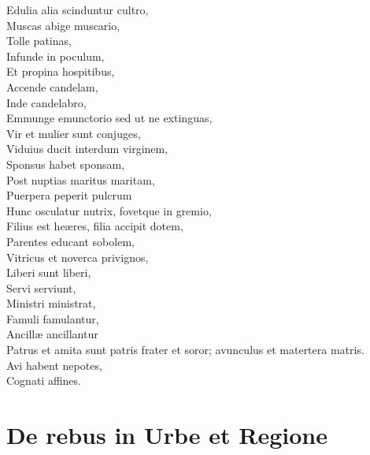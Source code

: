 \documentclass[12pt, twocolumn]{memoir}
\begin{document}
Edulia alia scinduntur cultro,\\
Muscas abige muscario,\\
Tolle patinas,\\
Infunde in poculum,\\
Et propina hospitibus,\\
Accende candelam,\\
Inde candelabro,\\
Emmunge emunctorio sed ut ne extinguas,\\
Vir et mulier sunt conjuges,\\
Viduius ducit interdum virginem,\\
Sponsus habet sponsam,\\
Post nuptias maritus maritam,\\
Puerpera peperit pulcrum\\
Hunc osculatur nutrix, fovetque in gremio,\\
Filius est heæres, filia accipit dotem,\\
Parentes educant sobolem,\\
Vitricus et noverca privignos,\\
Liberi sunt liberi,\\
Servi serviunt,\\
Ministri ministrat,\\
Famuli famulantur,\\
Ancillæ ancillantur\\
Patrus et amita sunt patris frater et soror; avunculus et matertera matris.\\
Avi habent nepotes,\\
Cognati affines.\\

\chapter{De rebus in Urbe et Regione}
\end{document}
